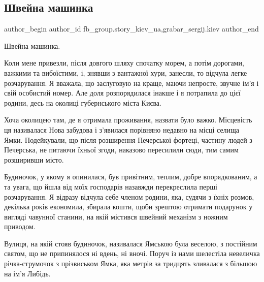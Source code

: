 
 
 
 
 
 
\subsection{Швейна машинка}
\label{sec:29_01_2022.fb.fb_group.story_kiev_ua.3.shvejna_mashynka}
 
\ifcmt
 author_begin
   author_id fb_group.story_kiev_ua,grabar_sergij.kiev
 author_end
\fi

Швейна машинка.

Коли мене привезли, після довгого шляху спочатку морем, а потім дорогами,
важкими та вибоїстими, і, знявши з вантажної хури, занесли, то відчула легке
розчарування. Я вважала, що заслуговую на краще, маючи непросте, звучне ім’я і
свій особистий номер. Але доля розпорядилася інакше і я потрапила до цієї
родини, десь на околиці губернського міста Києва.


Хоча околицею там, де я отримала проживання, назвати було важко. Місцевість ця
називалася Нова забудова і з’явилася порівняно недавно на місці селища Ямки.
Подейкували, що після розширення Печерської фортеці, частину людей з Печерська,
не питаючи їхньої згоди, наказово пересилили сюди, тим самим розширивши місто.

Будиночок, у якому я опинилася, був привітним, теплим, добре впорядкованим, а
та увага, що йшла від моїх господарів назавжди перекреслила перші розчарування.
Я відразу відчула себе членом родини, яка, судячи з їхніх розмов, декілька
років економила, збирала кошти, щоби  зрештою отримати подарунок у вигляді
чавунної станини, на якій містився швейний механізм з ножним приводом.

Вулиця, на якій стояв будиночок, називалася Ямською була веселою, з постійним
святом, що не припинялося ні вдень, ні вночі. Поруч із нами шелестіла невеличка
річка-струмочок з прізвиськом Ямка, яка метрів за тридцять зливалася з більшою
на ім’я Либідь.

